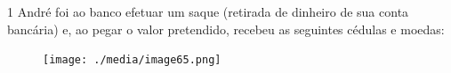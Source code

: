 \num{1} André foi ao banco efetuar um saque (retirada de dinheiro de sua conta
bancária) e, ao pegar o valor pretendido, recebeu as seguintes cédulas e moedas:

\begin{figure}[htpb!]
\centering
\texttt{[image: ./media/image65.png]}
\end{figure}

